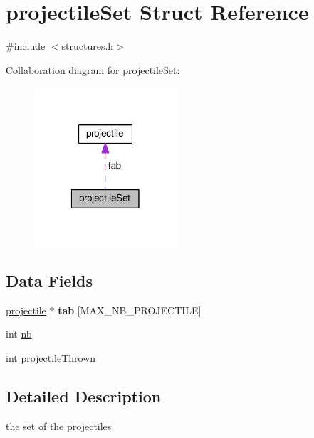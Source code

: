 \hypertarget{structprojectile_set}{\section{projectile\-Set Struct Reference}
\label{structprojectile_set}
}


{\ttfamily \#include $<$structures.\-h$>$}



Collaboration diagram for projectile\-Set\-:
\nopagebreak
\begin{figure}[H]
\begin{center}
\leavevmode
\includegraphics[width=150pt]{structprojectile_set__coll__graph}
\end{center}
\end{figure}
\subsection*{Data Fields}
\begin{DoxyCompactItemize}
\item 
\hypertarget{structprojectile_set_ac4cbcd75bc678f0ad2b2d416ce87dc6d}{\hyperlink{structprojectile}{projectile} $\ast$ {\bfseries tab} \mbox{[}M\-A\-X\-\_\-\-N\-B\-\_\-\-P\-R\-O\-J\-E\-C\-T\-I\-L\-E\mbox{]}}\label{structprojectile_set_ac4cbcd75bc678f0ad2b2d416ce87dc6d}

\item 
int \hyperlink{structprojectile_set_ab310c6afcc676eab3930dce2650511c0}{nb}
\item 
int \hyperlink{structprojectile_set_accfd9d1d6194770a3368821b58ffc3b6}{projectile\-Thrown}
\end{DoxyCompactItemize}


\subsection{Detailed Description}
the set of the projectiles 

